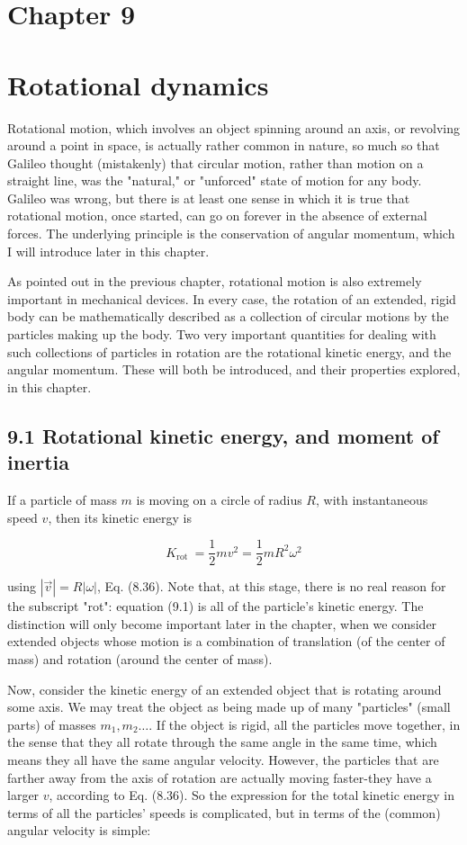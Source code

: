 \documentclass[10pt]{article}
\begin{document}
\section*{Chapter 9}
\section*{Rotational dynamics}
Rotational motion, which involves an object spinning around an axis, or revolving around a point in space, is actually rather common in nature, so much so that Galileo thought (mistakenly) that circular motion, rather than motion on a straight line, was the "natural," or "unforced" state of motion for any body. Galileo was wrong, but there is at least one sense in which it is true that rotational motion, once started, can go on forever in the absence of external forces. The underlying principle is the conservation of angular momentum, which I will introduce later in this chapter.

As pointed out in the previous chapter, rotational motion is also extremely important in mechanical devices. In every case, the rotation of an extended, rigid body can be mathematically described as a collection of circular motions by the particles making up the body. Two very important quantities for dealing with such collections of particles in rotation are the rotational kinetic energy, and the angular momentum. These will both be introduced, and their properties explored, in this chapter.

\subsection*{9.1 Rotational kinetic energy, and moment of inertia}
If a particle of mass $m$ is moving on a circle of radius $R$, with instantaneous speed $v$, then its kinetic energy is


\begin{equation*}
K_{\text {rot }}=\frac{1}{2} m v^{2}=\frac{1}{2} m R^{2} \omega^{2} \tag{9.1}
\end{equation*}


using $|\vec{v}|=R|\omega|$, Eq. (8.36). Note that, at this stage, there is no real reason for the subscript "rot": equation (9.1) is all of the particle's kinetic energy. The distinction will only become important later in the chapter, when we consider extended objects whose motion is a combination of translation (of the center of mass) and rotation (around the center of mass).

Now, consider the kinetic energy of an extended object that is rotating around some axis. We may treat the object as being made up of many "particles" (small parts) of masses $m_{1}, m_{2} \ldots$. If the object is rigid, all the particles move together, in the sense that they all rotate through the same angle in the same time, which means they all have the same angular velocity. However, the particles that are farther away from the axis of rotation are actually moving faster-they have a larger $v$, according to Eq. (8.36). So the expression for the total kinetic energy in terms of all the particles' speeds is complicated, but in terms of the (common) angular velocity is simple:
\end{document}
